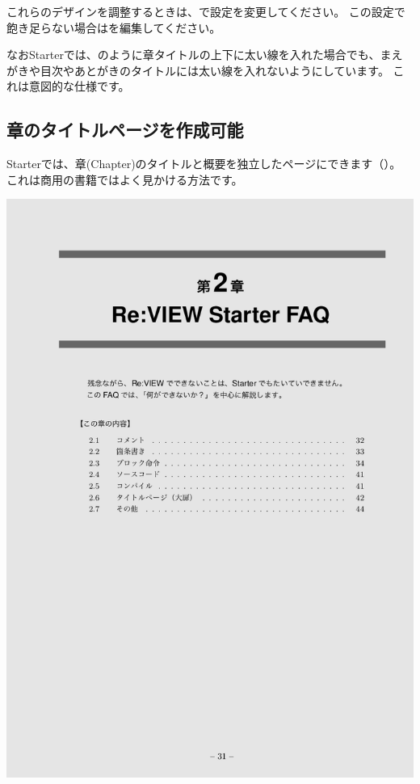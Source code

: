 これらのデザインを調整するときは、で設定を変更してください。
この設定で飽き足らない場合はを編集してください。

なおStarterでは、のように章タイトルの上下に太い線を入れた場合でも、まえがきや目次やあとがきのタイトルには太い線を入れないようにしています。
これは意図的な仕様です。

\subsection*{章のタイトルページを作成可能}
\label{sec:1-2-9}

Starterでは、章(Chapter)のタイトルと概要を独立したページにできます（）。
これは商用の書籍ではよく見かける方法です。

\begin{reviewimage}%
\includegraphics[width=0.5\maxwidth]{./images/chap01-starter/chaptitlepage_sample.png}%
\label{image:chap01-starter:chaptitlepage_sample}
\end{reviewimage}


